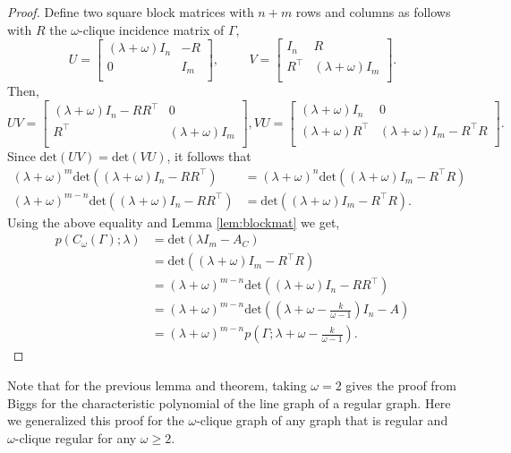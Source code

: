 \documentclass[12pt]{report}
\theoremstyle{definition}
\begin{document}
\begin{proof}
    Define two square block matrices with $n+m$ rows and columns as follows with $R$ the $\omega$-clique incidence matrix of $\Gamma$,
    \[U = \begin{bmatrix}(\lambda+\omega) I_n & -R \\0 & I_m \\\end{bmatrix}, \hspace{1cm}
    V = \begin{bmatrix}I_n & R \\R^\top  & (\lambda+\omega) I_m \\\end{bmatrix}.\]
Then, 
\[UV = \begin{bmatrix}(\lambda+\omega) I_n - RR^\top  & 0 \\R^\top  & (\lambda+\omega) I_m \\\end{bmatrix}, 
    VU = \begin{bmatrix}(\lambda+\omega) I_n & 0 \\(\lambda+\omega) R^\top  & (\lambda+\omega) I_m - R^\top R \\\end{bmatrix}.\]
Since $\text{det}(UV)=\text{det}(VU)$, it follows that
\begin{align*}
    (\lambda+\omega)^m \text{det}((\lambda+\omega) I_n - RR^\top ) & =(\lambda+\omega)^n \text{det}((\lambda+\omega) I_m - R^\top R) \\ 
    (\lambda+\omega)^{m-n} \text{det}((\lambda+\omega) I_n - RR^\top ) & =\text{det}((\lambda+\omega) I_m - R^\top R).
\end{align*}
Using the above equality and Lemma \ref{lem:blockmat} we get,
\begin{align*}
    p(C_\omega(\Gamma);\lambda) & = \text{det}(\lambda I_m - A_C) \\ 
    & = \text{det}((\lambda + \omega)I_m - R^\top R)  \\
    & = (\lambda + \omega)^{m-n}\text{det}((\lambda + \omega)I_n - RR^\top ) \\
    & = (\lambda + \omega)^{m-n}\text{det}\left(\left(\lambda + \omega - \frac{k}{\omega -1}\right)I_n - A\right)\\
    & = (\lambda + \omega)^{m-n}p\left(\Gamma ; \lambda + \omega - \frac{k}{\omega -1}\right).
\end{align*}
\end{proof}
Note that for the previous lemma and theorem, taking $\omega =2$ gives the proof from Biggs \cite[p.18-19]{biggs} for the characteristic polynomial of the line graph of a regular graph. Here we generalized this proof for the $\omega$-clique graph of any graph that is regular and $\omega$-clique regular for any $\omega \geq 2$.\par
\end{document}
